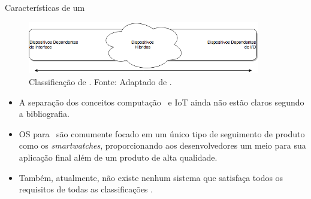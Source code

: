    \begin{frame}{Características de um \Wearable} \vspace{-1em}
      
      \begin{figure}[h] \centering
         \vspace{-5pt}
         \includegraphics[width=0.9\textwidth]{img/rt-gradiente.png}
         \caption{Classificação de \wearables. Fonte: Adaptado de \cite{Amorim2017}.}
      \end{figure}
      \begin{itemize}
         \setlength{\itemsep}{1em}
         \item A separação dos conceitos computação \wearable\ e IoT ainda não estão claros segundo a bibliografia. 
         
         \item OS para \wearable\ são comumente focado em um único tipo de seguimento de produto como os \textit{smartwatches}, proporcionando aos desenvolvedores um meio para sua aplicação final além de um produto de alta qualidade.
         
         \item Também, atualmente, não existe nenhum sistema que satisfaça todos os requisitos de todas as classificações \cite{Amorim2017}.
      \end{itemize}
   \end{frame}


